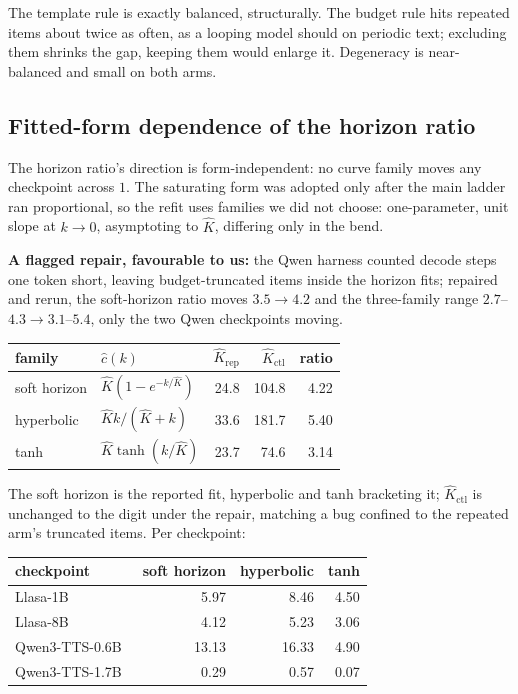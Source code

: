 The template rule is exactly balanced, structurally. The budget rule hits repeated items about
twice as often, as a looping model should on periodic text; excluding them shrinks the gap,
keeping them would enlarge it. Degeneracy is near-balanced and small on both arms.

\subsection{Fitted-form dependence of the horizon ratio}
\label{sec:horizonform}

The horizon ratio's direction is form-independent: no curve family moves any checkpoint across
$1$. The saturating form was adopted only after the main ladder ran proportional, so the refit
uses families we did not choose: one-parameter, unit slope at $k\to0$, asymptoting to $\hat K$,
differing only in the bend.

\noindent\textbf{A flagged repair, favourable to us:} the Qwen harness counted decode steps one
token short, leaving budget-truncated items inside the horizon fits; repaired and rerun, the
soft-horizon ratio moves $3.5\to4.2$ and the three-family range $2.7$--$4.3\to3.1$--$5.4$, only
the two Qwen checkpoints moving.

\begin{center}
\begin{tabular}{llrrr}
\toprule
family & $\hat c(k)$ & $\hat K_{\mathrm{rep}}$ & $\hat K_{\mathrm{ctl}}$ & ratio \\
\midrule
soft horizon & $\hat K(1-e^{-k/\hat K})$ & 24.8 & 104.8 & 4.22 \\
hyperbolic   & $\hat K k/(\hat K+k)$     & 33.6 & 181.7 & 5.40 \\
tanh         & $\hat K\tanh(k/\hat K)$   & 23.7 &  74.6 & 3.14 \\
\bottomrule
\end{tabular}
\end{center}

\noindent The soft horizon is the reported fit, hyperbolic and tanh bracketing it;
$\hat K_{\mathrm{ctl}}$ is unchanged to the digit under the repair, matching a bug confined to
the repeated arm's truncated items. Per checkpoint:

\begin{center}
\begin{tabular}{lrrr}
\toprule
checkpoint & soft horizon & hyperbolic & tanh \\
\midrule
Llasa-1B~\cite{ye2025llasa} &  5.97 &  8.46 & 4.50 \\
Llasa-8B &  4.12 &  5.23 & 3.06 \\
Qwen3-TTS-0.6B~\cite{hu2026qwen3tts} & 13.13 & 16.33 & 4.90 \\
Qwen3-TTS-1.7B &  0.29 &  0.57 & 0.07 \\
\bottomrule
\end{tabular}
\end{center}

